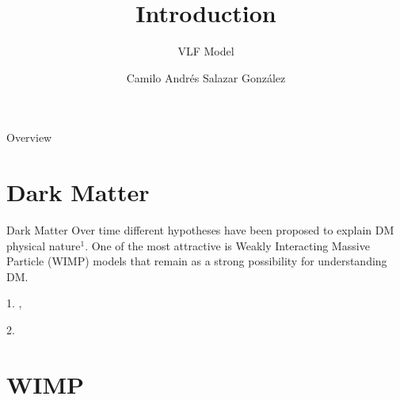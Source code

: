 \documentclass[compress,xcolor=table]{beamer}
\title{Introduction}
\subtitle{VLF Model} %
\date{\formatdate{22}{03}{2020}}
\author{Camilo Andrés Salazar González}
\institute{Physics Institute} %
\begin{document}
\begin{frame}[plain]
	\titlepage
	\setcounter{framenumber}{0}
\end{frame}
\begin{frame}[allowframebreaks]{Overview}
\begin{multicols}{2}
\tableofcontents
\end{multicols}
\end{frame}
\section{Dark Matter}
\begin{frame}{Dark Matter}
Over time different hypotheses have been proposed to explain DM physical nature$^1$. One of the most attractive is Weakly Interacting Massive Particle (WIMP) models that remain as a strong possibility for understanding DM.


	\begin{spacing}{0.5}
	{\tiny
		1. , \cite{Garrett:2010hd}
		
		2. 
		
	}
\end{spacing}
\end{frame}

\section{WIMP} 
\end{document}
